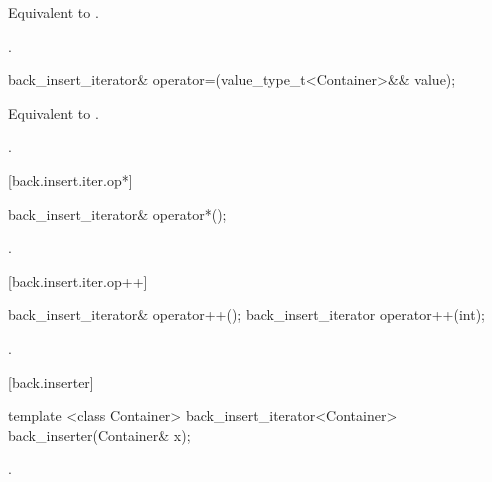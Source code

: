 \begin{itemdescr}
\pnum
\effects Equivalent to
.

\pnum
\returns
{}.
\end{itemdescr}

%
\begin{itemdecl}
back_insert_iterator&
  operator=(value_type_t<Container>&& value);
\end{itemdecl}

\begin{itemdescr}
\pnum
\effects Equivalent to
.

\pnum
\returns
{}.
\end{itemdescr}

[back.insert.iter.op*]{}

%
\begin{itemdecl}
back_insert_iterator& operator*();
\end{itemdecl}

\begin{itemdescr}
\pnum
\returns
{}.
\end{itemdescr}

[back.insert.iter.op++]{}

%
\begin{itemdecl}
back_insert_iterator& operator++();
back_insert_iterator operator++(int);
\end{itemdecl}

\begin{itemdescr}
\pnum
\returns
{}.
\end{itemdescr}

[back.inserter]{ }

%
\begin{itemdecl}
template <class Container>
  back_insert_iterator<Container> back_inserter(Container& x);
\end{itemdecl}

\begin{itemdescr}
\pnum
\returns
{}.
\end{itemdescr}

